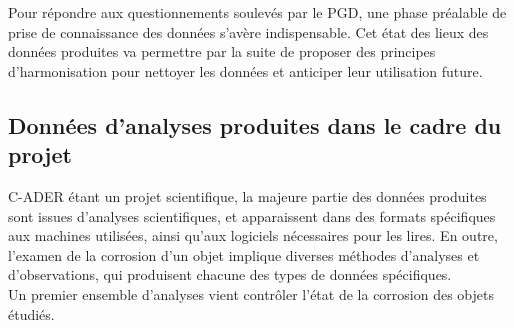  
Pour répondre aux questionnements soulevés par le PGD, une phase préalable de prise de connaissance des données s'avère indispensable. Cet état des lieux des données produites va permettre par la suite de proposer des principes d'harmonisation pour nettoyer les données et anticiper leur utilisation future.

        \subsection{Données d’analyses produites dans le cadre du projet} 

C-ADER étant un projet scientifique, la majeure partie des données produites sont issues d’analyses scientifiques, et apparaissent dans des formats spécifiques aux machines utilisées, ainsi qu’aux logiciels nécessaires pour les lires. En outre, l'examen de la corrosion d'un objet implique diverses méthodes d'analyses et d'observations, qui produisent chacune des types de données spécifiques.\\

Un premier ensemble d’analyses vient contrôler l’état de la corrosion des objets étudiés.\\

